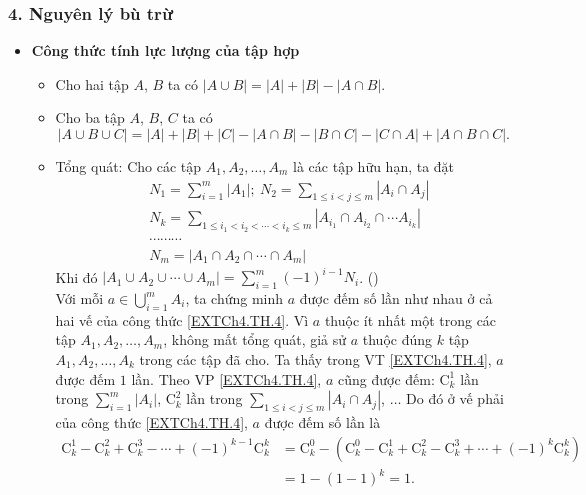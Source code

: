 \subsubsection{4. Nguyên lý bù trừ}
\begin{itemize}
 \item {\bf Công thức tính lực lượng của tập hợp}
		\begin{itemize}
			\item Cho hai tập $A$, $B$ ta có $|A \cup B| = |A|+|B|-|A\cap B|.$
			\item Cho ba tập $A$, $B$, $C$ ta có \[ |A \cup B \cup C| = |A|+|B| + |C| - |A\cap B| - |B \cap C| - |C \cap A| + |A \cap B \cap C|. \]
			\item Tổng quát: Cho các tập $A_1,A_2,\dots, A_m$ là các tập hữu hạn, ta đặt 
			\begin{align*}
			& N_1 = \sum \limits_{i=1}^m |A_1|; \ N_2 = \sum \limits_{1\le i < j \le m} | A_i \cap A_j |\\
			& N_k = \sum \limits_{1\le i_1<i_2<\cdots <i_k \le m} |A_{i_1} \cap A_{i_2} \cap \cdots A_{i_k}|\\
			& \cdots \cdots \cdots \\
			& N_m = |A_1 \cap A_2 \cap \cdots \cap A_m|
			\end{align*}
			Khi đó $\displaystyle |A_1 \cup A_2 \cup \cdots \cup A_m| = \sum \limits_{i=1}^m (-1)^{i-1} N_i$. \hfill(\theequation)\label{EXTCh4.TH.4} \\
			\cm Với mỗi $\displaystyle a\in \bigcup \limits_{i=1}^m A_i$, ta chứng minh $a$ được đếm số lần như nhau ở cả hai vế của công thức \eqref{EXTCh4.TH.4}. Vì $a$ thuộc ít nhất một trong các tập $A_1, A_2, \ldots, A_m$, không mất tổng quát, giả sử $a$ thuộc đúng $k$ tập $A_1, A_2, \ldots, A_k$ trong các tập đã cho. Ta thấy trong VT \eqref{EXTCh4.TH.4}, $a$ được đếm $1$ lần. Theo VP \eqref{EXTCh4.TH.4}, $a$ cũng được đếm: $\mathrm{C}^1_k$ lần trong $\displaystyle \sum \limits_{i=1}^m |A_i|$, $\mathrm{C}_k^2$ lần trong $\displaystyle \sum \limits_{1\le i<j\le m} | A_i \cap A_j|$, $\ldots$ Do đó ở vế phải của công thức \eqref{EXTCh4.TH.4}, $a$ được đếm số lần là
			\begin{align*}
			\mathrm{C}_k^1 - \mathrm{C}_k^2 + \mathrm{C}_k^3 - \cdots + (-1)^{k-1} \mathrm{C}_k^k 
			& = \mathrm{C}_k^0 - \left( \mathrm{C}_k^0 - \mathrm{C}_k^1 + \mathrm{C}_k^2 - \mathrm{C}_k^3 + \cdots + (-1)^k \mathrm{C}_k^k \right) \\
			& = 1 - (1-1)^k = 1.
			\end{align*}

\end{itemize}
\end{itemize}
